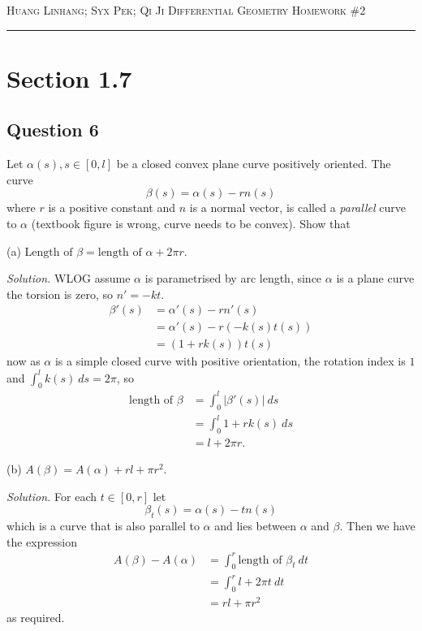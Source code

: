 \documentclass[12pt]{article}
\begin{document}
\thispagestyle{empty}

{\scshape Huang Linhang; Syx Pek; Qi Ji} \hfill {\scshape \large Differential Geometry} \hfill {\scshape Homework \#2}

\smallskip
\hrule
\bigskip

\section{Section 1.7}

\subsection*{Question 6}

Let \(\alpha(s), s\in[0,l]\) be a closed convex plane curve positively oriented. The curve \[\beta(s) = \alpha(s) - rn(s)\]
where \(r\) is a positive constant and \(n\) is a normal vector, is called a \emph{parallel} curve to \(\alpha\) (textbook figure is wrong, curve needs to be convex).
Show that

(a) \(\text{Length of }\beta = \text{length of }\alpha + 2\pi r\).

\textit{Solution.}
WLOG assume \(\alpha\) is parametrised by arc length, since \(\alpha\) is a plane curve the torsion is zero, so \(n' = -kt\).
\begin{align*}
    \beta'(s) &= \alpha'(s) - r n'(s) \\
              &= \alpha'(s) - r(-k(s) t(s)) \\
              &= (1+rk(s))t(s)
\end{align*}
now as \(\alpha\) is a simple closed curve with positive orientation, the rotation index is \(1\) and \(\int_0^l k(s)\ ds = 2\pi\), so
\begin{align*}
    \text{length of }\beta
    &= \int_0^l \left\lvert \beta'(s) \right\rvert\ ds \\
    &= \int_0^l 1 + r k(s) \ ds \\
    &= l + 2\pi r.
\end{align*}

(b) \(A(\beta) = A(\alpha) + rl + \pi r^2\).

\textit{Solution.}
For each \(t\in[0,r]\) let
\[\beta_t(s) = \alpha(s) - t n(s)\]
which is a curve that is also parallel to \(\alpha\) and lies between \(\alpha\) and \(\beta\).
Then we have the expression
\begin{align*}
    A(\beta) - A(\alpha) &= \int_0^r \text{length of }\beta_t \ dt \\
                         &= \int_0^r l + 2\pi t\ dt \\
                         &= rl + \pi r^2
\end{align*}
as required.
\end{document}
